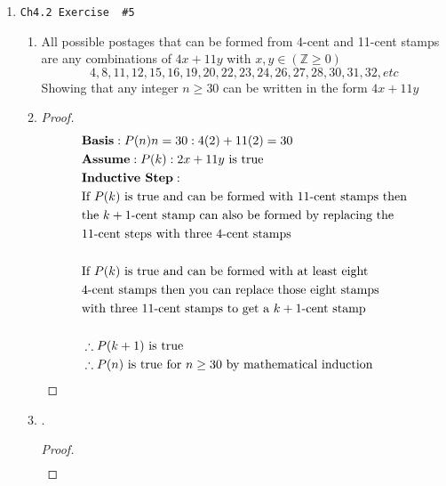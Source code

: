 \documentclass[11pt]{article}
\begin{document}
\begin{enumerate}
    \item \begin{verbatim}Ch4.2 Exercise  #5\end{verbatim}
        \begin{enumerate}
            \item All possible postages that can be formed from 4-cent and 11-cent
                stamps are any combinations of $4x + 11y$ with $x,y\in(\mathbb{Z} \ge 0)$
                $$ 4,8,11,12,15,16,19,20,22,23,24,26,27,28,30,31,32,etc $$
                Showing that any integer $n\ge30$ can be written in the form $4x+11y$
            \item 
                \begin{proof}
                    \begin{align*}
                        & \textbf{Basis}: P(n) n = 30 : 4(2) + 11(2) = 30 \\
                        & \textbf{Assume}: P(k) : 2x + 11y \text{ is true}\\
                        & \textbf{Inductive Step}: \\
                        & \text{If $P(k)$ is true and can be formed with 11-cent stamps then} \\
                        & \text{the $k+1$-cent stamp can also be formed by replacing the} \\
                        & \text{11-cent steps with three 4-cent stamps} \\
                        & \\
                        & \text{If $P(k)$ is true and can be formed with at least eight} \\
                        & \text{4-cent stamps then you can replace those eight stamps} \\
                        & \text{with three 11-cent stamps to get a $k+1$-cent stamp} \\ 
                        & \\
                        & \therefore P(k+1) \text{ is true} \\
                        & \therefore P(n) \text{ is true for $n\ge30$ by mathematical induction} \qedhere
                    \end{align*}
                \end{proof}
            \item .
                \begin{proof}
                    \begin{align*}

\end{align*}
\end{proof}
\end{enumerate}
\end{enumerate}
\end{document}
